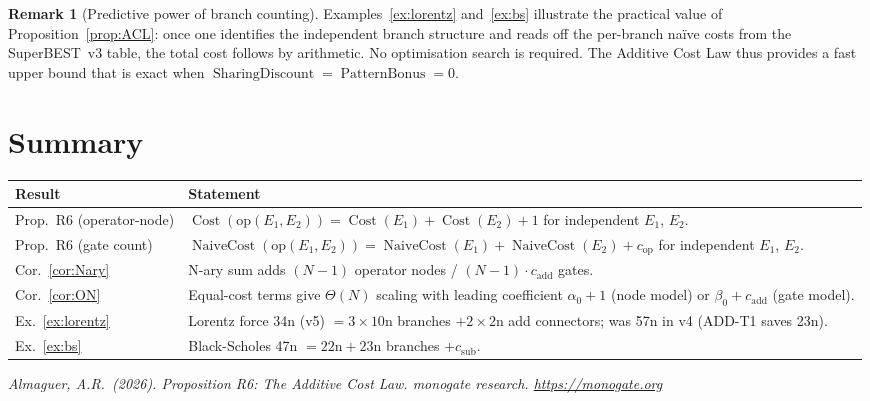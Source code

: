 \documentclass[12pt,a4paper]{article}
\theoremstyle{definition}
\newtheorem{remark}[theorem]{Remark}
\newcommand{\Cost}{\operatorname{Cost}}
\newcommand{\NC}{\operatorname{NaiveCost}}
\newcommand{\SD}{\operatorname{SharingDiscount}}
\newcommand{\PB}{\operatorname{PatternBonus}}
\begin{document}
\begin{remark}[Predictive power of branch counting]
\label{rem:predictive}
Examples~\ref{ex:lorentz} and~\ref{ex:bs} illustrate the practical value of
Proposition~\ref{prop:ACL}: once one identifies the independent branch
structure and reads off the per-branch na\"{i}ve costs from the SuperBEST~v3
table, the total cost follows by arithmetic.  No optimisation search is
required.  The Additive Cost Law thus provides a fast upper bound that is exact
when $\SD = \PB = 0$.
\end{remark}

\section*{Summary}

\begin{center}
\begin{tabular}{@{}lL{9cm}@{}}
\toprule
\textbf{Result} & \textbf{Statement} \\
\midrule
Prop.\ R6 (operator-node)
  & $\Cost(\mathrm{op}(E_1,E_2)) = \Cost(E_1) + \Cost(E_2) + 1$
    for independent $E_1$, $E_2$. \\[4pt]
Prop.\ R6 (gate count)
  & $\NC(\mathrm{op}(E_1,E_2)) = \NC(E_1) + \NC(E_2) + c_{\mathrm{op}}$
    for independent $E_1$, $E_2$. \\[4pt]
Cor.\ \ref{cor:Nary}
  & N-ary sum adds $(N-1)$ operator nodes / $(N-1)\cdot c_{\mathrm{add}}$
    gates. \\[4pt]
Cor.\ \ref{cor:ON}
  & Equal-cost terms give $\Theta(N)$ scaling with leading coefficient
    $\alpha_0 + 1$ (node model) or $\beta_0 + c_{\mathrm{add}}$ (gate model). \\[4pt]
Ex.\ \ref{ex:lorentz}
  & Lorentz force 34n (v5) $= 3 \times 10\mathrm{n}$ branches
    $+ 2 \times 2\mathrm{n}$ add connectors; was 57n in v4 (ADD-T1 saves 23n). \\[4pt]
Ex.\ \ref{ex:bs}
  & Black-Scholes 47n $= 22\mathrm{n} + 23\mathrm{n}$ branches
    $+ c_{\mathrm{sub}}$. \\
\bottomrule
\end{tabular}
\end{center}

\bigskip
\noindent\textit{Almaguer, A.R.\ (2026).
Proposition R6: The Additive Cost Law.
monogate research. \url{https://monogate.org}}
\end{document}
